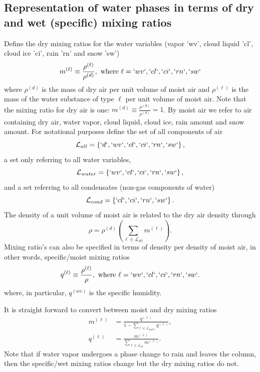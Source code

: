 \documentclass{agujournal}
\begin{document}
\subsection{Representation of water phases in terms of dry and wet (specific) mixing ratios}\label{sec:mixing_ratios}
Define the dry mixing ratios for the water variables (vapor 'wv', cloud liquid 'cl', cloud ice 'ci', rain 'rn' and snow 'sw')
\begin{equation}
m^{(\ell)}\equiv \frac{\rho^{(\ell)}}{\rho^{(d)}}, \text{ where }\ell=`wv`,`cl`,`ci`,`rn`,`sw`\label{eq:mx}
\end{equation}
where $\rho^{(d)}$ is the mass of dry air per unit volume of moist air and $\rho^{(\ell)}$ is the mass of the water substance of type $\ell$ per unit volume of moist air.  Note that  the mixing ratio for dry air is one: $m^{(d)}\equiv \frac{\rho^{(d)}}{\rho^{(d)}}=1$. 
By moist air we refer to air containing dry air, water vapor, cloud liquid, cloud ice, rain amount and snow amount. For notational purposes define the set of all components of air
\begin{equation}
\mathcal{L}_{all}=\left\{ `d`,`wv`,`cl`,`ci`,`rn`,`sw`\right\},
\end{equation}
a set only referring to all water variables,
\begin{equation}
\mathcal{L}_{water}=\left\{`wv`,`cl`,`ci`,`rn`,`sw`\right\},
\end{equation}
and a set referring to all condensates (non-gas components of water)
\begin{equation}
\mathcal{L}_{cond}=\left\{`cl`,`ci`,`rn`,`sw`\right\}.
\end{equation}
The density of a unit volume of moist air is related to the dry air density through
\begin{equation}
\rho=\rho^{(d)}\left(\sum_{\ell \in \mathcal{L}_{all}} m^{(\ell)}\right).
\end{equation}
Mixing ratio's can also be specified in terms of density per density of moist air, in other words, specific/moist mixing ratios
\begin{equation}
q^{(\ell)}\equiv \frac{\rho^{(\ell)}}{\rho}, \text{ where }\ell=`wv`,`cl`,`ci`,`rn`,`sw`\label{eq:qx}.
\end{equation}
where, in particular, $q^{(wv)}$ is the specific humidity. 


It is straight forward to convert between moist and dry mixing ratios
\begin{align}
m^{(\ell)}&=\frac{q^{(\ell)}}{1-\sum_{\ell \in \mathcal{L}_{water}} q^{(\ell)}},\label{eq:mxqx}\\
q^{(\ell)}&=\frac{m^{(\ell)}}{\sum_{\ell \in \mathcal{L}_{all}} m^{(\ell)}}.
\end{align}
Note that if water vapor undergoes a phase change to rain and leaves the column, then the specific/wet mixing ratios change but the dry mixing ratios do not.
\end{document}
